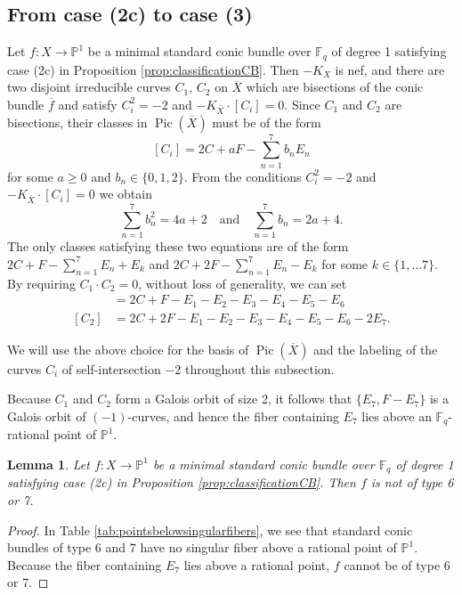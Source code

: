 \documentclass[a4paper, 11pt, reqno]{amsart}
\numberwithin{equation}{section} \numberwithin{figure}{section}
\DeclareMathOperator{\Pic}{Pic}
\def \F {{\mathbb F}}
\def \P {{\mathbb P}}
\newcommand{\ra}{\rightarrow}
\newtheorem{lemma}{Lemma}
\theoremstyle{definition}
\numberwithin{lemma}{section}
\begin{document}
\subsection{From case (2c) to case (3)}\label{sec:case(2c)}
Let $f \colon X \ra \P^1$ be a minimal standard conic bundle over $\F_q$ of degree 1 satisfying case (2c) in Proposition \ref{prop:classificationCB}. Then $-K_X$ is nef, and there are two disjoint irreducible curves $C_1$, $C_2$ on $\overline{X}$ which are bisections of the conic bundle $\overline{f}$ and satisfy $C_i^2 = -2$ and $-K_{\overline{X}} \cdot [C_i] = 0$. Since $C_1$ and $C_2$ are bisections, their classes in $\Pic(\overline{X})$ must be of the form \[[C_i] = 2C + a F - \sum_{n=1}^7 b_n E_n\]
for some $a \geq 0$ and $b_n \in \{0, 1, 2\}$.
From the conditions $C_i^2 = -2$ and $-K_{\overline{X}} \cdot [C_i] = 0$ we obtain \[\sum_{n=1}^7 b_{n}^2 = 4a + 2 \quad \text{and} \quad \sum_{n=1}^7 b_{n} = 2a + 4.\]
The only classes satisfying these two equations are of the form $2C + F - \sum_{n=1}^7 E_n + E_k$ and $2C + 2F - \sum_{n=1}^7 E_n - E_k$ for some $k \in \{1, \ldots 7\}$. By requiring $C_1 \cdot C_2 = 0$, without loss of generality, we can set
\begin{align*}
    [C_1] &= 2C + F - E_1 - E_2 - E_3 - E_4 - E_5 - E_6\\
    [C_2] &= 2C + 2F -E_1 - E_2 - E_3 - E_4 - E_5 - E_6 - 2E_7.
\end{align*}

We will use the above choice for the basis of $\Pic(\overline{X})$ and the labeling of the curves $C_i$ of self-intersection $-2$ throughout this subsection.

Because $C_1$ and $C_2$ form a Galois orbit of size 2, it follows that $\{E_7, F - E_7\}$ is a Galois orbit of $(-1)$-curves, and hence the fiber containing $E_7$ lies above an $\F_q$-rational point of $\P^1$.

\begin{lemma}\label{lem:(2c)not67}
    Let $f \colon X \ra \P^1$ be a minimal standard conic bundle over $\F_q$ of degree 1 satisfying case (2c) in Proposition \ref{prop:classificationCB}. Then $f$ is not of type 6 or 7.
\end{lemma}

\begin{proof}
    In Table \ref{tab:pointsbelowsingularfibers}, we see that standard conic bundles of type 6 and 7 have no singular fiber above a rational point of $\P^1$. Because the fiber containing $E_7$ lies above a rational point, $f$ cannot be of type 6 or 7.
\end{proof}
\end{document}
